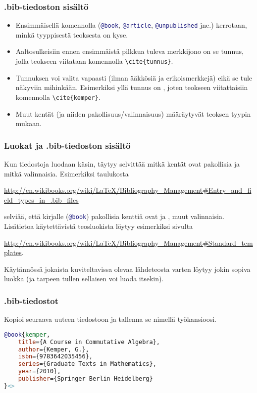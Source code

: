 \begin{fframe}
    \frametitle{.bib-tiedoston sisältö}
    \begin{itemize}[<+->]
        \item Ensimmäisellä komennolla (\lstinline[language=BibTeX]-@book-, \lstinline[language=BibTeX]-@article-, \lstinline[language=BibTeX]-@unpublished- jne.) kerrotaan, minkä tyyppisestä teoksesta on kyse. 
        \item Aaltosulkeisiin ennen ensimmäistä pilkkua tuleva merkkijono on se tunnus, jolla teokseen viitataan komennolla \lstinline-\cite{tunnus}-. 
        \item Tunnuksen voi valita vapaasti (ilman ääkkösiä ja erikoismerkkejä) eikä se tule näkyviin mihinkään.  Esimerkiksi yllä tunnus on , joten teokseen viitattaisiin komennolla \lstinline-\cite{kemper}-.
        \item Muut kentät (ja niiden pakollisuus/valinnaisuus) määräytyvät teoksen tyypin mukaan.
    \end{itemize}
\end{fframe}

\begin{fframe}
    \frametitle{Luokat ja .bib-tiedoston sisältö}
    Kun tiedostoja luodaan käsin, täytyy selvittää mitkä kentät ovat pakollisia ja mitkä valinnaisia. 
    \vaihto
    Esimerkiksi taulukosta 
    \begin{scriptsize}
        \url{http://en.wikibooks.org/wiki/LaTeX/Bibliography_Management#Entry_and_field_types_in_.bib_files}
    \end{scriptsize}
    selviää, että kirjalle (\lstinline[language=BibTeX]-@book-) pakollisia kenttiä ovat  ja , muut valinnaisia.
    \pause
    \vaihto
    Lisätietoa käytettävistä teosluokista löytyy esimerkiksi sivulta
    \begin{scriptsize}
        \url{http://en.wikibooks.org/wiki/LaTeX/Bibliography_Management#Standard_templates}.
    \end{scriptsize}
    \vaihto
    Käytännössä jokaista kuviteltavissa olevaa lähdeteosta varten löytyy jokin sopiva luokka (ja tarpeen tullen sellaisen voi luoda itsekin).
\end{fframe}

\begin{fframe}
    \frametitle{.bib-tiedostot}
    \begin{harj}
        Kopioi seuraava uuteen tiedostoon ja tallenna se nimellä  työkansioosi. 
        \begin{lstlisting}[language=BibTeX,basicstyle=\ttfamily\small]
@book{kemper,
    title={A Course in Commutative Algebra},
    author={Kemper, G.},
    isbn={9783642035456},
    series={Graduate Texts in Mathematics},
    year={2010},
    publisher={Springer Berlin Heidelberg}
}<>
        \end{lstlisting}
    \end{harj}
\end{fframe}

